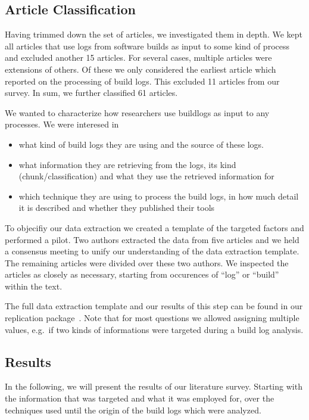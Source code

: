 \subsection{Article Classification}
Having trimmed down the set of articles, we investigated them in depth.
We kept all articles that use logs from software builds as input to
some kind of process and excluded another 15 articles.
For several cases, multiple articles were extensions of others.
Of these we only considered the earliest article which reported on
the processing of build logs.
This excluded 11 articles from our survey.
In sum, we further classified 61 articles.

We wanted to characterize how researchers use buildlogs as input to
any processes.
We were interesed in
\begin{itemize}
  \item what kind of build logs they are using and the source of these
  logs.
  \item what information they are retrieving from the logs,
  its kind (chunk/classification) and
  what they use the retrieved information for
  \item which technique they are using to process the build logs,
  in how much detail it is described and whether they published their
  tools
\end{itemize}
To objecifiy our data extraction we created a template of the targeted
factors and performed a pilot.
Two authors extracted the data from five articles and we held a
consensus meeting to unify our understanding
of the data extraction template.
The remaining articles were divided over these two authors.
We inspected the articles as closely as necessary,
starting from occurences of ``log'' or ``build'' within the text.

The full data extraction template and our results of this step can be
found in our replication package~\cite{brandt2020chunk-replication}.
Note that for most questions we allowed assigning multiple values,
e.g.\ if
two kinds of informations were targeted during a build log analysis.

\subsection{Results}
In the following, we will present the results of our literature survey.
Starting with the information that was targeted and what it was employed
for, over the techniques used until the origin of the build logs
which were analyzed.


